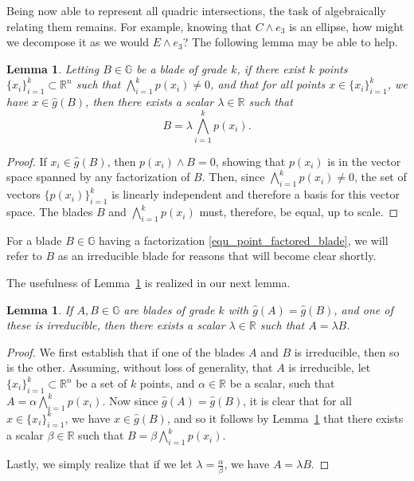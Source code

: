 \documentclass{birkjour}
\newtheorem{lem}[thm]{Lemma}
\theoremstyle{definition}
\theoremstyle{remark}
\numberwithin{equation}{section}
\newcommand{\R}{\mathbb{R}}
\newcommand{\G}{\mathbb{G}}
\newcommand{\gh}{\hat{g}}
\begin{document}
Being now able to represent all quadric intersections, the task of
algebraically relating them remains.  For example, knowing that
$C\wedge e_3$ is an ellipse, how might we decompose it
as we would $E\wedge e_3$?  The following lemma may be able to help.
\begin{lem}\label{lma_point_factored_blade}
Letting $B\in\G$ be a blade of grade $k$, if there exist $k$ points $\{x_i\}_{i=1}^k\subset\R^n$
such that $\bigwedge_{i=1}^k p(x_i)\neq 0$, and that for all points
$x\in\{x_i\}_{i=1}^k$, we have $x\in\gh(B)$, then there exists a scalar $\lambda\in\R$
such that
\begin{equation}\label{equ_point_factored_blade}
B = \lambda\bigwedge_{i=1}^k p(x_i).
\end{equation}
\end{lem}
\begin{proof}
If $x_i\in\gh(B)$, then $p(x_i)\wedge B=0$, showing that $p(x_i)$ is in the vector
space spanned by any factorization of $B$.  Then, since $\bigwedge_{i=1}^k p(x_i)\neq 0$,
the set of vectors $\{p(x_i)\}_{i=1}^k$ is linearly independent and therefore
a basis for this vector space.  The blades $B$ and $\bigwedge_{i=1}^k p(x_i)$
must, therefore, be equal, up to scale.
\end{proof}
For a blade $B\in\G$ having a factorization \eqref{equ_point_factored_blade},
we will refer to $B$ as an irreducible blade for reasons that will become clear shortly.

The usefulness of Lemma~\ref{lma_point_factored_blade} is realized in our next lemma.
\begin{lem}\label{lma_equating_blades}
If $A,B\in\G$ are blades of grade $k$ with $\gh(A)=\gh(B)$, and one of these is irreducible,
then there exists a scalar $\lambda\in\R$ such that $A=\lambda B$.
\end{lem}
\begin{proof}
We first establish that if one of the blades $A$ and $B$ is irreducible, then so is the other.
Assuming, without loss of generality, that $A$ is irreducible, let $\{x_i\}_{i=1}^k\subset\R^n$
be a set of $k$ points, and $\alpha\in\R$ be a scalar, such that $A=\alpha\bigwedge_{i=1}^k p(x_i)$.
Now since $\gh(A)=\gh(B)$, it is clear that for all $x\in\{x_i\}_{i=1}^k$, we have $x\in\gh(B)$,
and so it follows by Lemma~\ref{lma_point_factored_blade} that there exists a scalar $\beta\in\R$
such that $B=\beta\bigwedge_{i=1}^k p(x_i)$.

Lastly, we simply realize that if we let $\lambda=\frac{\alpha}{\beta}$, we have
$A=\lambda B$.
\end{proof}
\end{document}
